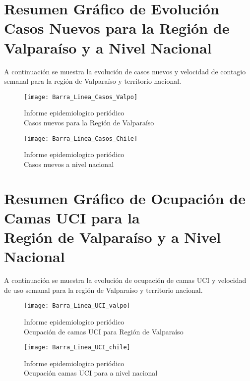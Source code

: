 \documentclass{article}
\begin{document}
\section{Resumen Gráfico de Evolución Casos Nuevos para la Región de Valparaíso y a Nivel Nacional}

A continuación se muestra la evolución de casos nuevos y velocidad de contagio semanal para la región de Valparaíso y territorio nacional.

\begin{figure}[H]
	\texttt{[image: Barra\_Linea\_Casos\_Valpo]}
	\centering
	\caption{Informe epidemiologico periódico \\ Casos nuevos para la Región de Valparaíso}
\end{figure}

\begin{figure}[H]
	\texttt{[image: Barra\_Linea\_Casos\_Chile]}
	\centering
	\caption{Informe epidemiologico periódico \\ Casos nuevos a nivel nacional}
\end{figure}

\hfill \break
\hfill \break
\hfill \break
\hfill \break
\hfill \break
\hfill \break
\hfill \break
\hfill \break
\hfill \break
\hfill \break
\hfill \break
\hfill \break
\hfill \break
\hfill \break
\hfill \break

\section{Resumen Gráfico de Ocupación de Camas UCI para la \\ Región de Valparaíso y a Nivel Nacional}

A continuación se muestra la evolución de ocupación de camas UCI y velocidad de uso semanal para la región de Valparaíso y territorio nacional.

\begin{figure}[H]
	\texttt{[image: Barra\_Linea\_UCI\_valpo]}
	\centering
	\caption{Informe epidemiologico periódico \\ Ocupación de camas UCI para Región de Valparaíso}
\end{figure}

\begin{figure}[H]
	\texttt{[image: Barra\_Linea\_UCI\_chile]}
	\centering
	\caption{Informe epidemiologico periódico \\ Ocupación camas UCI para a nivel nacional}
\end{figure}
\end{document}
